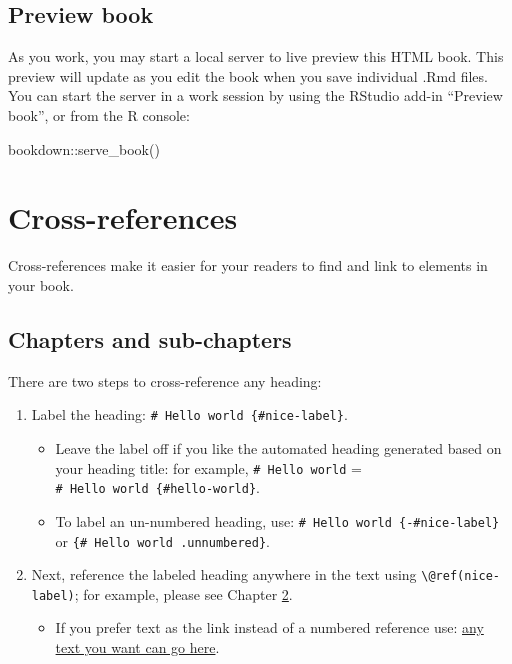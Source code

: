 \documentclass[12pt, oneside, openright]{byuthesis}
\providecommand{\tightlist}{%
  \setlength{\itemsep}{0pt}\setlength{\parskip}{0pt}}
\newenvironment{Shaded}{\begin{snugshade}}{\end{snugshade}}
\newcommand{\FunctionTok}[1]{\textcolor[rgb]{0.00,0.00,0.00}{#1}}
\newcommand{\NormalTok}[1]{#1}
\newcommand{\SpecialCharTok}[1]{\textcolor[rgb]{0.00,0.00,0.00}{#1}}
\begin{document}
\hypertarget{preview-book}{%
\section{Preview book}\label{preview-book}}

As you work, you may start a local server to live preview this HTML book. This preview will update as you edit the book when you save individual .Rmd files. You can start the server in a work session by using the RStudio add-in ``Preview book'', or from the R console:

\begin{Shaded}
\begin{Highlighting}[]
\NormalTok{bookdown}\SpecialCharTok{::}\FunctionTok{serve\_book}\NormalTok{()}
\end{Highlighting}
\end{Shaded}

\hypertarget{cross}{%
\chapter{Cross-references}\label{cross}}

Cross-references make it easier for your readers to find and link to elements in your book.

\hypertarget{chapters-and-sub-chapters}{%
\section{Chapters and sub-chapters}\label{chapters-and-sub-chapters}}

There are two steps to cross-reference any heading:

\begin{enumerate}
\def\labelenumi{\arabic{enumi}.}
\tightlist
\item
  Label the heading: \texttt{\#\ Hello\ world\ \{\#nice-label\}}.

  \begin{itemize}
  \tightlist
  \item
    Leave the label off if you like the automated heading generated based on your heading title: for example, \texttt{\#\ Hello\ world} = \texttt{\#\ Hello\ world\ \{\#hello-world\}}.
  \item
    To label an un-numbered heading, use: \texttt{\#\ Hello\ world\ \{-\#nice-label\}} or \texttt{\{\#\ Hello\ world\ .unnumbered\}}.
  \end{itemize}
\item
  Next, reference the labeled heading anywhere in the text using \texttt{\textbackslash{}@ref(nice-label)}; for example, please see Chapter \ref{cross}.

  \begin{itemize}
  \tightlist
  \item
    If you prefer text as the link instead of a numbered reference use: \protect\hyperlink{cross}{any text you want can go here}.
  \end{itemize}
\end{enumerate}
\end{document}
